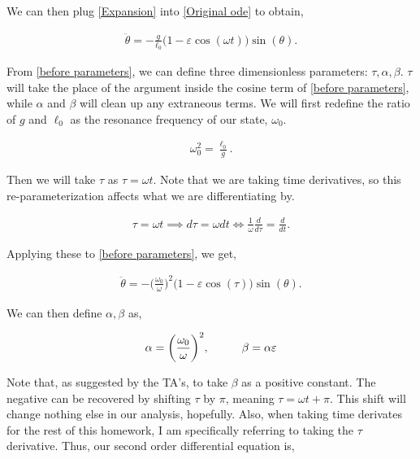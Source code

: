 \documentclass[12pt]{article}
\newcommand{\ep}{\varepsilon}
\begin{document}
\begin{enumerate}
\begin{solution}
        We can then plug \ref{Expansion} into \ref{Original ode} to obtain,

        \begin{align}
            \ddot{\theta} = -\frac{g}{\ell_0}\Big(1 - \ep \cos(\omega t)\Big)\sin(\theta). \label{before parameters}
        \end{align}

        From \ref{before parameters}, we can define three dimensionless parameters: $\tau, \alpha, \beta$. $\tau$ will take the place of the argument inside the cosine term of \ref{before parameters}, while $\alpha$ and $\beta$ will clean up any extraneous terms. We will first redefine the ratio of $g$ and $\ell_0$ as the resonance frequency of our state, $\omega_0$.
        
        \begin{align*}
            \omega_0^2 = \frac{\ell_0}{g}.    
        \end{align*}

        Then we will take $\tau$ as $\tau = \omega t$. Note that we are taking time derivatives, so this re-parameterization affects what we are differentiating by. 

        \begin{align*}
            \tau = \omega t \implies d\tau = \omega dt \iff \frac{1}{\omega}\frac{d}{d\tau} = \frac{d}{dt}.
        \end{align*}

        Applying these to \ref{before parameters}, we get,

        \begin{align}
            \ddot{\theta} = -\Big(\frac{\omega_0}{\omega} \Big)^2 \big( 1 - \ep \cos(\tau) \big) \sin(\theta).  \label{before alphabeta}
        \end{align}

        We can then define $\alpha, \beta$ as,

        \begin{align}
            \alpha = \bigg(\frac{\omega_0}{\omega}\bigg)^2, \hspace{10mm} \beta = \alpha\ep
        \end{align}

        Note that, as suggested by the TA's, to take $\beta$ as a positive constant. The negative can be recovered by shifting $\tau$ by $\pi$, meaning $\tau = \omega t + \pi$. This shift will change nothing else in our analysis, hopefully. Also, when taking time derivates for the rest of this homework, I am specifically referring to taking the $\tau$ derivative. Thus, our second order differential equation is, 


\end{solution}
\end{enumerate}
\end{document}

